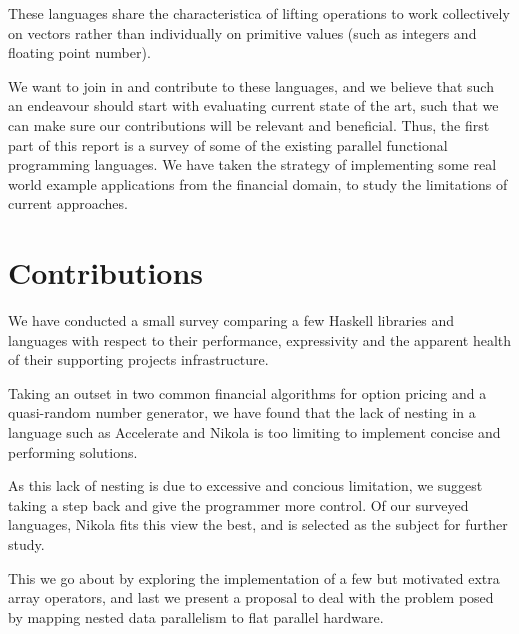 These languages share the characteristica of lifting operations to
work collectively on vectors rather than individually on primitive
values (such as integers and floating point number).

We want to join in and contribute to these languages, and we believe
that such an endeavour should start with evaluating current state of
the art, such that we can make sure our contributions will be relevant
and beneficial. Thus, the first part of this report is a survey of
some of the existing parallel functional programming languages. We
have taken the strategy of implementing some real world example
applications from the financial domain, to study the limitations of
current approaches.


\section{Contributions}

We have conducted a small survey comparing a few Haskell libraries and
languages with respect to their performance, expressivity and the apparent
health of their supporting projects infrastructure.

Taking an outset in two common financial algorithms for option pricing
and a quasi-random number generator, we have found that the lack of
nesting in a language such as Accelerate and Nikola is too limiting to
implement concise and performing solutions.

As this lack of nesting is due to excessive and concious limitation, we suggest
taking a step back and give the programmer more control. Of our surveyed
languages, Nikola fits this view the best, and is selected as the subject for
further study.

This we go about by exploring the implementation of a few but motivated extra
array operators, and last we present a proposal to deal with the problem posed
by mapping nested data parallelism to flat parallel hardware.

